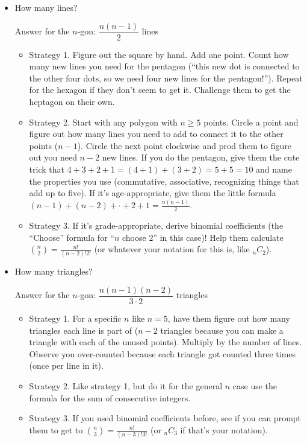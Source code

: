 \documentclass{article}
\begin{document}
    \begin{itemize}
        \item How many lines? 
    
        Answer for the $n$-gon: $\dfrac{n(n-1)}{2}$ lines
        \begin{itemize}
            \item Strategy 1. Figure out the square by hand. Add one point. Count how many new lines you need for the pentagon (``this new dot is connected to the other four dots, so we need four new lines for the pentagon!''). Repeat for the hexagon if they don't seem to get it. Challenge them to get the heptagon on their own.
            \item Strategy 2. Start with any polygon with $n \geq 5$ points. Circle a point and figure out how many lines you need to add to connect it to the other points ($n-1$). Circle the next point clockwise and prod them to figure out you need $n-2$ new lines. If you do the pentagon, give them the cute trick that $4 + 3 + 2 + 1 = (4+1) + (3+2) = 5 + 5 = 10$ and name the properties you use (commutative, associative, recognizing things that add up to five). If it's age-appropriate, give them the little formula $(n-1) + (n-2) + \cdot + 2 + 1 = \frac{n(n-1)}{2}$.
            \item Strategy 3. If it's grade-appropriate, derive binomial coefficients (the ``Choose'' formula for ``$n$ choose $2$'' in this case)! Help them calculate $\binom{n}{2} = \frac{n!}{(n-2)!2!}$ (or whatever your notation for this is, like $_nC_2$).
        \end{itemize}
        \item How many triangles? 
    
        Answer for the $n$-gon: $\dfrac{n(n-1)(n-2)}{3\cdot2}$ triangles
        \begin{itemize}
            \item Strategy 1. For a specific $n$ like $n = 5$, have them figure out how many triangles each line is part of ($n-2$ triangles because you can make a triangle with each of the unused points). Multiply by the number of lines. Observe you over-counted because each triangle got counted three times (once per line in it).
            \item Strategy 2. Like strategy 1, but do it for the general $n$ case use the formula for the sum of consecutive integers.
            \item Strategy 3. If you used binomial coefficients before, see if you can prompt them to get to $\binom{n}{3} = \frac{n!}{(n-3)!3!}$ (or $_nC_3$ if that's your notation).
        \end{itemize}
    \end{itemize}
\end{document}
